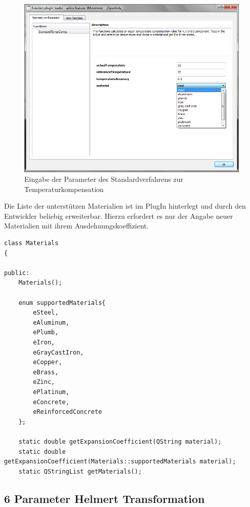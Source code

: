 \begin{figure}[H]
	\label{fig:standardverfahren}
	\centering
		\includegraphics[scale=2.0]{bilder/standardverfahren}
	\caption[Eingabe der Parameter des Standardverfahrens]{Eingabe der Parameter des Standardverfahrens zur Temperaturkompensation}
\end{figure}

Die Liste der unterstützen Materialien ist im PlugIn hinterlegt und durch den Entwickler beliebig erweiterbar. Hierzu erfordert es nur der Angabe neuer Materialien mit ihrem Ausdehnungskoeffizient.
\begin{lstlisting}[caption={unterstütze Materialien (Ausschnitt aus \cClass{materials.h})},captionpos=t]
class Materials
{

public:
    Materials();

    enum supportedMaterials{
        eSteel,
        eAluminum,
        ePlumb,
        eIron,
        eGrayCastIron,
        eCopper,
        eBrass,
        eZinc,
        ePlatinum,
        eConcrete,
        eReinforcedConcrete
    };

    static double getExpansionCoefficient(QString material);
    static double getExpansionCoefficient(Materials::supportedMaterials material);
    static QStringList getMaterials();
\end{lstlisting}


\subsection{6 Parameter Helmert Transformation}\label{sec:6paramhelmert}

